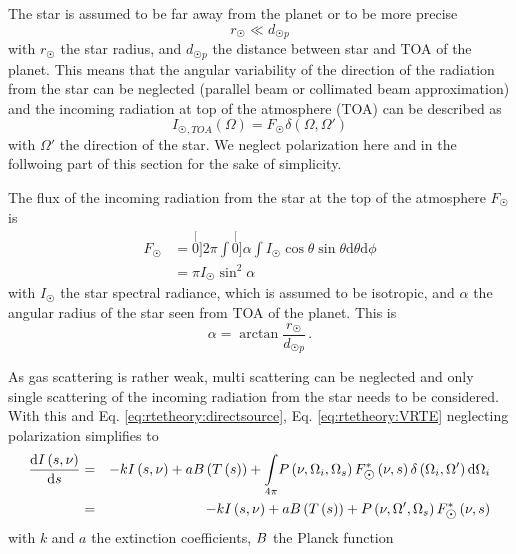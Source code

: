  The star is assumed to be far away from the planet or to be more precise
 \begin{equation}
  r_{\astrosun} \ll d_{\astrosun p}
 \end{equation} with $r_{\astrosun}$ the star radius,
 and $d_{\astrosun p}$ the distance between star and TOA of the planet. 
 This means that the angular variability of the direction of the  radiation 
 from the star can be neglected (parallel beam or collimated  beam approximation) 
 and the incoming radiation at top of  the atmosphere (TOA) can be described as 
 \begin{equation}
 I_{\astrosun,TOA}\left(\Omega\right)=F_{\astrosun}\delta\left(\Omega,\Omega'\right)\label{eq:rtetheory:directsource}
 \end{equation}
 with $\Omega'$ the direction of the star. We neglect polarization here and in the follwoing part of this section for 
 the sake of simplicity. 

 The flux of the incoming radiation from the star at the top of the atmosphere
 $F_{\astrosun}$ is 
\begin{align}
F_{\astrosun} & =\stackrel[0]{2\pi}{\int}\stackrel[0]{\alpha}{\int}I_{\astrosun}\cos\theta\sin\theta\text{d}\theta\text{d}\phi\\
 & =\pi I_{\astrosun}\sin^{2}\alpha
\end{align}
with $I_{\astrosun}$ the star spectral radiance, which is assumed
to be isotropic, and $\alpha$ the angular radius of the star seen
from TOA of the planet. This is 
\begin{equation}
\alpha=\arctan\frac{r_{\astrosun}}{d_{\astrosun p}}\,.
\end{equation}

As gas scattering is rather weak, multi scattering can be neglected and only
single scattering of the incoming radiation from the star needs to be considered. 
With this and Eq. \ref{eq:rtetheory:directsource}, Eq. \ref{eq:rtetheory:VRTE} 
neglecting polarization simplifies to  
\begin{eqnarray}
  \label{eq:rtetheory:ClearskyRTE}
  \frac{\mathrm{d}I\left(s,\nu\right)}{\mathrm{d}s} & = & -kI\left(s,\nu\right)
  +a\Planck\left(T\left(s\right)\right)+\underset{4\pi}{\int}P\left(\nu,\Omega_{i},\Omega_{s}\right)
  F_{\astrosun}^{*}\left(\nu,s\right)\delta\left(\Omega_{i},\Omega'\right)\mathrm{d}\Omega_{i}\\
  & = & -kI\left(s,\nu\right)+aB\left(T\left(s\right)\right)+P\left(\nu,\Omega',\Omega_{s}\right)F_{\astrosun}^{*}\left(\nu,s\right)
\end{eqnarray}
with $k$ and $a$ the extinction coefficients, $B$ the Planck function
 


